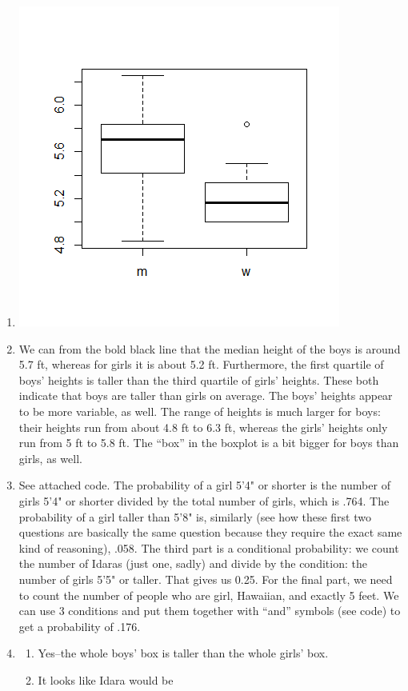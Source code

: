 \documentclass[12pt]{article}
\begin{document}
\begin{enumerate}
	\item \includegraphics{hw5boxplot}
	\item We can from the bold black line that the median height of the boys is around 5.7 ft, whereas for girls it is about 5.2 ft. Furthermore, the first quartile of boys' heights is taller than the third quartile of girls' heights. These both indicate that boys are taller than girls on average. The boys' heights appear to be more variable, as well. The range of heights is much larger for boys: their heights run from about 4.8 ft to 6.3 ft, whereas the girls' heights only run from 5 ft to 5.8 ft. The ``box'' in the boxplot is a bit bigger for boys than girls, as well.
	\item See attached code. The probability of a girl 5'4" or shorter is the number of girls 5'4" or shorter divided by the total number of girls, which is .764. The probability of a girl taller than 5'8" is, similarly (see how these first two questions are basically the same question because they require the exact same kind of reasoning), .058. The third part is a conditional probability: we count the number of Idaras (just one, sadly) and divide by the condition: the number of girls 5'5" or taller. That gives us 0.25. For the final part, we need to count the number of people who are girl, Hawaiian, and exactly 5 feet. We can use 3 conditions and put them together with ``and'' symbols (see code) to get a probability of .176.
	\item
		\begin{enumerate}
			\item Yes--the whole boys' box is taller than the whole girls' box.
			\item It looks like Idara would be 
		\end{enumerate}
\end{enumerate}
\end{document}
